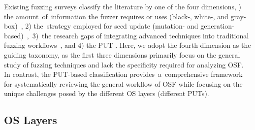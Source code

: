 
Existing fuzzing surveys classify the literature by one of the four dimensions, ) the amount~of~information the fuzzer requires or uses (black-, white-, and gray-box)~\cite{Mans2018TheAS, Li2018FuzzingAS, Liang2018FuzzingSO, Godefroid2020, bohme2020fuzzing}, 
2) the~strategy employed for seed update (mutation- and generation-based)~\cite{Saavedra2019ARO, schumilo2020hyper, schumilo2021nyx, myung2022mundofuzz, pan2021V-shuttle, cesarano2023iris, bulekov2022morphuzz},~3)~the research gaps of integrating advanced techniques into traditional fuzzing workflows~\cite{Wang2019ASR, Zhang2018SurveyOD, Wang2020SoKTP, Zhu2022FuzzingAS, Mallissery2023DemystifyTF}, and 
4) the PUT \cite{Yun2022FuzzingOE, Eisele2022EmbeddedFA}. 
Here, we adopt the fourth dimension as the guiding taxonomy, as the first three dimensions primarily focus on the general study of fuzzing techniques and lack the specificity required for analyzing OSF. In contrast, the PUT-based classification provides~a~comprehensive framework for systematically reviewing the general workflow of OSF while focusing on the unique challenges posed by the different OS layers (\ie different PUTs).


\subsection{OS Layers}\label{Section3-2}

